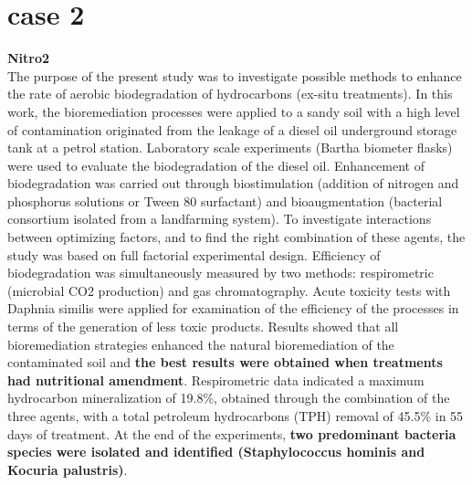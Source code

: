 \documentclass[twocolumn]{article} %
\begin{document}
\section{case 2}
\textbf{Nitro2}\cite{nitro2}\\
The purpose of the present study was to investigate possible methods to enhance the rate of aerobic biodegradation of hydrocarbons (ex-situ treatments). In this work, the bioremediation processes were applied to a sandy soil with a high level of contamination originated from the leakage of a diesel oil underground storage tank at a petrol station. Laboratory scale experiments (Bartha biometer flasks) were used to evaluate the biodegradation of the diesel oil. Enhancement of biodegradation was carried out through biostimulation (addition of nitrogen and phosphorus solutions or Tween 80 surfactant) and bioaugmentation (bacterial consortium isolated from a landfarming system). To investigate interactions between optimizing factors, and to find the right combination of these agents, the study was based on full factorial experimental design. Efficiency of biodegradation was simultaneously measured by two methods: respirometric (microbial CO2 production) and gas chromatography. Acute toxicity tests with Daphnia similis were applied for examination of the efficiency of the processes in terms of the generation of less toxic products. Results showed that all bioremediation strategies enhanced the natural bioremediation of the contaminated soil and \textbf{the best results were obtained when treatments had nutritional amendment}. Respirometric data indicated a maximum hydrocarbon mineralization of 19.8\%, obtained through the combination of the three agents, with a total petroleum hydrocarbons (TPH) removal of 45.5\% in 55 days of treatment. At the end of the experiments, \textbf{two predominant bacteria species were isolated and identified (Staphylococcus hominis and Kocuria palustris)}.
\\
\end{document}
